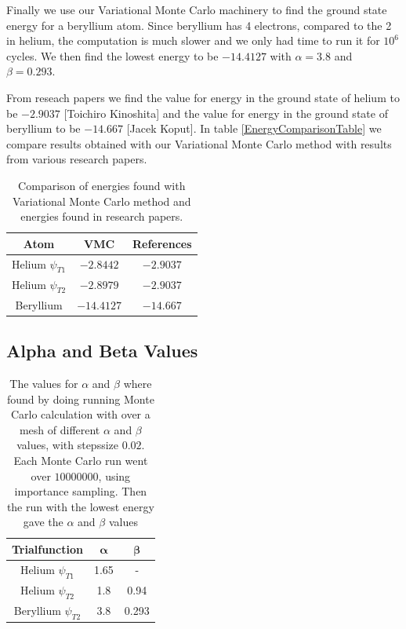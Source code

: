 \documentclass[11pt]{article}
\begin{document}
Finally we use our Variational Monte Carlo machinery to find the ground
state energy for a beryllium atom. Since beryllium has 4 electrons,
compared to the 2 in helium, the computation is much slower and we
only had time to run it for $10^{6}$ cycles. We then find the lowest
energy to be $-14.4127$ with $\alpha=3.8$ and $\beta=0.293$. 

From reseach papers we find the value for energy in the ground state
of helium to be $-2.9037$ {[}Toichiro Kinoshita{]} and the value
for energy in the ground state of beryllium to be $-14.667$ {[}Jacek
Koput{]}. In table \ref{EnergyComparisonTable} we compare results
obtained with our Variational Monte Carlo method with results from
various research papers. 

\begin{table}
\centering %
\begin{tabular}{|c|c|c|}
\hline 
Atom & VMC & References\tabularnewline
\hline 
\hline 
Helium $\psi_{T1}$ & $-2.8442$ & $-2.9037$ \tabularnewline
\hline 
Helium $\psi_{T2}$ & $-2.8979$ & $-2.9037$ \tabularnewline
\hline 
Beryllium & $-14.4127$ & $-14.667$\tabularnewline
\hline 
\end{tabular}

\protect\caption{Comparison of energies found with Variational Monte Carlo method and
energies found in research papers.}


\end{table}

\subsection{Alpha and Beta Values}

\begin{table}
\center
		\begin{tabular}{| c | c| c |}
		    \hline
		   	\textbf{Trialfunction} & \(\mathbf{\alpha}\) & \(\mathbf{\beta}\)
		    \\ \hline
		    Helium $\psi_{T1}$ & 1.65 & -
		    \\ \hline 
		    Helium $\psi_{T2}$ & 1.8 & 0.94
		    \\	\hline 
		    Beryllium $\psi_{T2}$	& 3.8	&	 0.293
		    \\ \hline
	  \end{tabular}
	  \caption{The values for \(\alpha\) and \( \beta \) where found by doing running Monte Carlo calculation with over a mesh of different \(\alpha\) and \( \beta \) values, with stepssize \(0.02\). Each Monte Carlo run went over \(10 000 000\), using importance sampling. Then the run with the lowest energy gave the \(\alpha\) and \(\beta\) values}
	  \label{tab:alpha_beta}
\end{table}
\end{document}
